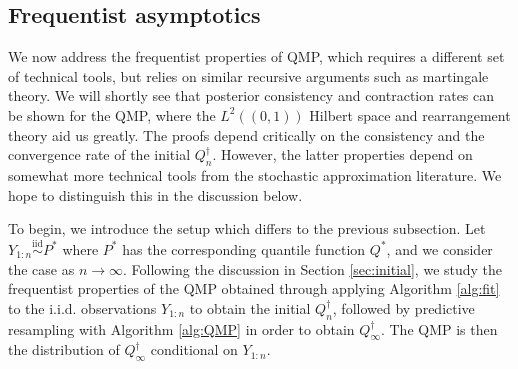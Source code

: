 \documentclass[11pt,a4paper]{article}
\newcommand{\iid}{\overset{\mathrm{iid}}{\sim}}
\begin{document}
\subsection{Frequentist asymptotics}
We now address the frequentist properties of QMP, which requires a different set of technical tools, but relies on similar recursive arguments such as martingale theory. We will shortly see that posterior consistency and contraction rates can be shown for the QMP, where the $L^2((0,1))$ Hilbert space and rearrangement theory aid us greatly. The proofs depend critically on the consistency and the convergence rate of the initial $Q_n^{\dagger}$. However, the latter properties depend on somewhat more technical tools from the stochastic approximation literature. We hope to distinguish this in the discussion below.

To begin, we introduce the setup which differs to the previous subsection. Let $Y_{1:n} \iid P^*$ where $P^*$ has the corresponding quantile function $Q^*$, and we consider the case as $n \to \infty$. 
Following the discussion in Section \ref{sec:initial}, we study the frequentist properties of the QMP obtained through applying {Algorithm \ref{alg:fit}} to the i.i.d. observations $Y_{1:n}$ to obtain the initial $Q_n^{\dagger}$, followed by predictive resampling with {Algorithm \ref{alg:QMP}} in order to obtain $Q^{\dagger}_\infty$. The QMP is then the distribution of $Q^{\dagger}_\infty$ conditional on  $Y_{1:n}$.
\end{document}
